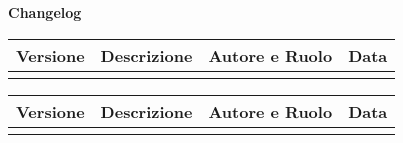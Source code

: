 \newpage

\begin{center}
	\Large{\textbf{Changelog}}
	\\\vspace{0.5cm}
	\normalsize
	\begin{tabularx}{\textwidth}{cXcc}
		\textbf{Versione} & \textbf{Descrizione} & \textbf{Autore e Ruolo} & \textbf{Data}\\\toprule
		\modificheuno
		\bottomrule
	\end{tabularx}
	\newpage
	\begin{tabularx}{\textwidth}{cXcc}
		\textbf{Versione} & \textbf{Descrizione} & \textbf{Autore e Ruolo} & \textbf{Data}\\\toprule
		\modifichedue
		\bottomrule
	\end{tabularx}
\end{center}

